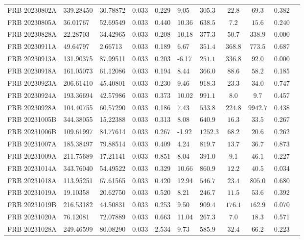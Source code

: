 \begin{longtable}{lllllllccll}
FRB 20230802A & 339.28450 & 30.78872 & 0.033 & 0.229 & 9.05 & $305.3$ & $22.8$ & $69.3$ & 0.382 \\
FRB 20230805A & 36.01767 & 52.69549 & 0.033 & 0.440 & 10.36 & $638.5$ & $7.2$ & $15.6$ & 0.240 \\
FRB 20230828A & 22.28703 & 34.42965 & 0.033 & 0.208 & 10.18 & $377.3$ & $50.7$ & $338.9$ & 0.000 \\
FRB 20230911A & 49.64797 & 2.66713 & 0.033 & 0.189 & 6.67 & $351.4$ & $368.8$ & $773.5$ & 0.687 \\
FRB 20230913A & 131.90375 & 87.99511 & 0.033 & 0.203 & -6.17 & $251.1$ & $336.8$ & $92.0$ & 0.000 \\
FRB 20230918A & 161.05073 & 61.12086 & 0.033 & 0.194 & 8.44 & $366.0$ & $88.6$ & $58.2$ & 0.185 \\
FRB 20230923A & 206.61410 & 45.40801 & 0.033 & 0.230 & 9.46 & $918.3$ & $23.3$ & $34.0$ & 0.747 \\
FRB 20230924A & 193.36694 & 42.57986 & 0.033 & 0.373 & 10.02 & $991.1$ & $8.0$ & $9.7$ & 0.457 \\
FRB 20230928A & 104.40755 & 60.57290 & 0.033 & 0.186 & 7.43 & $533.8$ & $224.8$ & $9942.7$ & 0.438 \\
FRB 20231005B & 344.38055 & 15.22388 & 0.033 & 0.313 & 8.08 & $640.9$ & $16.3$ & $33.5$ & 0.267 \\
FRB 20231006B & 109.61997 & 84.77614 & 0.033 & 0.267 & -1.92 & $1252.3$ & $68.2$ & $20.6$ & 0.262 \\
FRB 20231007A & 185.38497 & 79.88514 & 0.033 & 0.409 & 4.24 & $819.7$ & $13.7$ & $36.7$ & 0.873 \\
FRB 20231009A & 211.75689 & 17.21141 & 0.033 & 0.851 & 8.04 & $391.0$ & $9.1$ & $46.1$ & 0.227 \\
FRB 20231014A & 343.76040 & 54.49522 & 0.033 & 0.329 & 10.66 & $860.9$ & $12.2$ & $40.5$ & 0.034 \\
FRB 20231018A & 113.95251 & 67.61565 & 0.033 & 0.420 & 12.94 & $546.7$ & $23.4$ & $805.0$ & 0.680 \\
FRB 20231019A & 19.10358 & 20.62750 & 0.033 & 0.520 & 8.21 & $246.7$ & $11.5$ & $53.6$ & 0.392 \\
FRB 20231019B & 216.53182 & 44.50831 & 0.033 & 0.253 & 9.50 & $909.4$ & $176.1$ & $162.9$ & 0.070 \\
FRB 20231020A & 76.12081 & 72.07889 & 0.033 & 0.663 & 11.04 & $267.3$ & $7.0$ & $18.3$ & 0.571 \\
FRB 20231028A & 249.46599 & 80.08290 & 0.033 & 2.534 & 9.73 & $585.9$ & $32.4$ & $66.2$ & 0.223 \\

\end{longtable}
